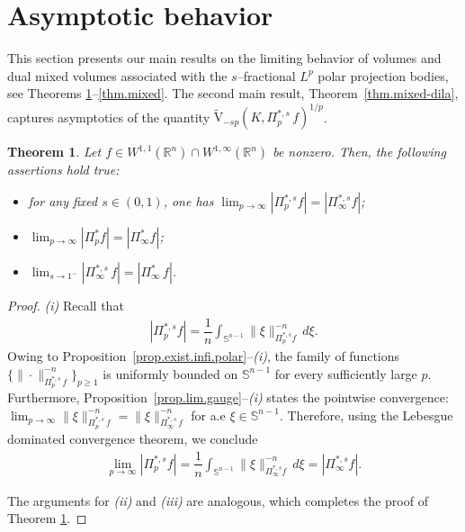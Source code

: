 \documentclass[11pt, reqno]{article}
\newtheorem{theorem}{Theorem}[section]
\theoremstyle{definition}
\numberwithin{equation}{section}
\newcommand{\R}{\mathbb{R}}
\newcommand{\Sphere}{\mathbb{S}^{n - 1}}
\newcommand{\vtil}{\widetilde{\mathrm{V}}}
\begin{document}
\section{Asymptotic behavior}\label{sec:asymptotics}

This section presents our main results on the limiting behavior of volumes and dual mixed volumes associated with the $s$--fractional $L^p$ polar projection bodies, see Theorems \ref{thm.volume}--\ref{thm.mixed}. 
The second main result, Theorem~\ref{thm.mixed-dila}, captures asymptotics of the quantity $\vtil_{-sp}(K, \Pi^{\ast, s}_p \, f)^{1/p}$.

\begin{theorem}\label{thm.volume}
    Let $f \in W^{1, 1}(\R^n) \cap W^{1, \infty}(\R^n)$ be nonzero.
    Then, the following assertions hold true:
    \begin{itemize}
        \item[(i)] for any fixed $s \in (0, 1)$, one has $        \textstyle\lim_{p \to \infty} |\Pi^{\ast, s}_p  f| =  |\Pi^{\ast, s}_\infty f|$; 

        \item[(ii)] $\textstyle\lim_{p \to \infty} |\Pi^\ast_p  f| = |\Pi^\ast_\infty  f|$;

        \item[(iii)] $\textstyle\lim_{s \to 1^-} |\Pi^{\ast, s}_\infty \, f| = |\Pi^\ast_\infty \, f|$.
    \end{itemize}
\end{theorem}

\begin{proof}
\textit{(i)}
Recall that 
	\begin{align*}
		| \Pi^{\ast, s}_p  f | = \dfrac{1}{n} \int_{\Sphere} \| \xi \|^{-n}_{\Pi^{\ast, s}_p  f} \, d\xi.
	\end{align*}
Owing to Proposition~\ref{prop.exist.infi.polar}--\textit{(i)}, the family of functions $ \big\{ \| \cdot \|^{-n}_{\Pi^{\ast, s}_p \, f} \big\}_{p \geq 1}$ is uniformly bounded on $\Sphere$ for every sufficiently large $p$.
Furthermore, Proposition~\ref{prop.lim.gauge}--\textit{(i)} states the pointwise convergence: $\textstyle\lim_{p \to \infty} \| \xi \|_{\Pi^{\ast, s}_p \, f}^{-n} = \| \xi \|_{\Pi^{\ast, s}_\infty \, f}^{-n}$ for a.e $\xi \in \Sphere$.
Therefore, using the Lebesgue dominated convergence theorem, we conclude 
\begin{align*}
	\lim_{p \to \infty} | \Pi^{\ast, s}_p f | = \dfrac{1}{n} \int_{\Sphere} \| \xi \|^{-n}_{\Pi^{\ast, s}_\infty f} \, d\xi = | \Pi^{\ast, s}_\infty f |.
\end{align*}

\medskip

The arguments for \textit{(ii)} and \textit{(iii)} are analogous, which completes the proof of Theorem \ref{thm.volume}.
\end{proof}
\end{document}
